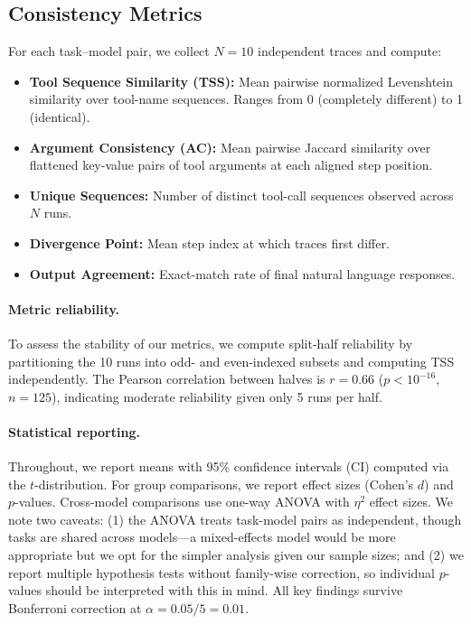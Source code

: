 \documentclass[letterpaper]{article}
\begin{document}
\subsection{Consistency Metrics}

For each task--model pair, we collect $N=10$ independent traces and compute:

\begin{itemize}[nosep]
    \item \textbf{Tool Sequence Similarity (TSS):} Mean pairwise normalized Levenshtein similarity over tool-name sequences. Ranges from 0 (completely different) to 1 (identical).
    \item \textbf{Argument Consistency (AC):} Mean pairwise Jaccard similarity over flattened key-value pairs of tool arguments at each aligned step position.
    \item \textbf{Unique Sequences:} Number of distinct tool-call sequences observed across $N$ runs.
    \item \textbf{Divergence Point:} Mean step index at which traces first differ.
    \item \textbf{Output Agreement:} Exact-match rate of final natural language responses.
\end{itemize}

\paragraph{Metric reliability.} To assess the stability of our metrics, we compute split-half reliability by partitioning the 10 runs into odd- and even-indexed subsets and computing TSS independently. The Pearson correlation between halves is $r = 0.66$ ($p < 10^{-16}$, $n = 125$), indicating moderate reliability given only 5 runs per half.

\paragraph{Statistical reporting.} Throughout, we report means with 95\% confidence intervals (CI) computed via the $t$-distribution. For group comparisons, we report effect sizes (Cohen's $d$) and $p$-values. Cross-model comparisons use one-way ANOVA with $\eta^2$ effect sizes. We note two caveats: (1) the ANOVA treats task-model pairs as independent, though tasks are shared across models---a mixed-effects model would be more appropriate but we opt for the simpler analysis given our sample sizes; and (2) we report multiple hypothesis tests without family-wise correction, so individual $p$-values should be interpreted with this in mind. All key findings survive Bonferroni correction at $\alpha = 0.05/5 = 0.01$.
\end{document}
